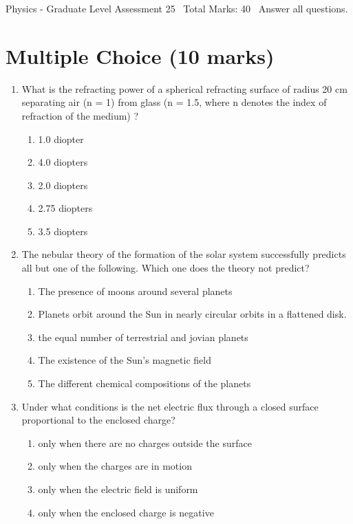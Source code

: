 \documentclass[12pt]{article}
\begin{document}
\begin{center}
Physics - Graduate Level Assessment 25 \
Total Marks: 40 \
Answer all questions.
\end{center}

\section*{Multiple Choice (10 marks)}
\begin{enumerate}[label=\arabic*.]
\item What is the refracting power of a spherical refracting surface of radius 20 cm separating air (n = 1) from glass (n = 1.5, where n denotes the index of refraction of the medium) ?
\begin{enumerate}[label=(\alph*)]
    \item 1.0 diopter
    \item 4.0 diopters
    \item 2.0 diopters
    \item 2.75 diopters
    \item 3.5 diopters
\end{enumerate}
\item The nebular theory of the formation of the solar system successfully predicts all but one of the following. Which one does the theory not predict?
\begin{enumerate}[label=(\alph*)]
    \item The presence of moons around several planets
    \item Planets orbit around the Sun in nearly circular orbits in a flattened disk.
    \item the equal number of terrestrial and jovian planets
    \item The existence of the Sun's magnetic field
    \item The different chemical compositions of the planets
\end{enumerate}
\item Under what conditions is the net electric flux through a closed surface proportional to the enclosed charge?
\begin{enumerate}[label=(\alph*)]
    \item only when there are no charges outside the surface
    \item only when the charges are in motion
    \item only when the electric field is uniform
    \item only when the enclosed charge is negative

\end{enumerate}
\end{enumerate}
\end{document}
